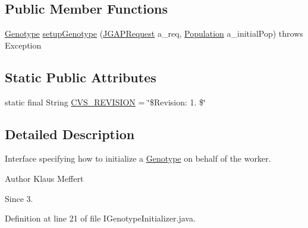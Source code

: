 \subsection*{Public Member Functions}
\begin{DoxyCompactItemize}
\item 
\hyperlink{classorg_1_1jgap_1_1_genotype}{Genotype} \hyperlink{interfaceorg_1_1jgap_1_1distr_1_1grid_1_1_i_genotype_initializer_af09dd385100d03346dc4c02c1826b584}{setup\-Genotype} (\hyperlink{classorg_1_1jgap_1_1distr_1_1grid_1_1_j_g_a_p_request}{J\-G\-A\-P\-Request} a\-\_\-req, \hyperlink{classorg_1_1jgap_1_1_population}{Population} a\-\_\-initial\-Pop)  throws Exception
\end{DoxyCompactItemize}
\subsection*{Static Public Attributes}
\begin{DoxyCompactItemize}
\item 
static final String \hyperlink{interfaceorg_1_1jgap_1_1distr_1_1grid_1_1_i_genotype_initializer_a11f1c5bfd2092a16b2226beb87fda448}{C\-V\-S\-\_\-\-R\-E\-V\-I\-S\-I\-O\-N} = \char`\"{}\$Revision\-: 1. \$\char`\"{}
\end{DoxyCompactItemize}


\subsection{Detailed Description}
Interface specifying how to initialize a \hyperlink{classorg_1_1jgap_1_1_genotype}{Genotype} on behalf of the worker.

\begin{DoxyAuthor}{Author}
Klaus Meffert 
\end{DoxyAuthor}
\begin{DoxySince}{Since}
3. 
\end{DoxySince}


Definition at line 21 of file I\-Genotype\-Initializer.\-java.



